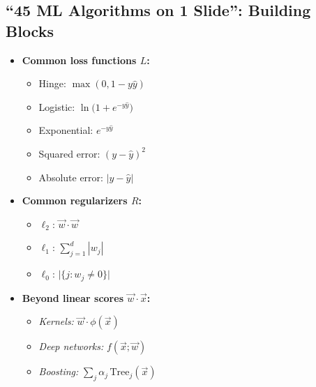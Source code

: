 \subsection{``45 ML Algorithms on 1 Slide'': Building Blocks}
\begin{itemize}
    \item \textbf{Common loss functions $L$:}
    \begin{itemize}
        \item Hinge: $\max(0,1-y\hat{y})$
        \item Logistic: $\ln\!\big(1+e^{-y\hat{y}}\big)$
        \item Exponential: $e^{-y\hat{y}}$
        \item Squared error: $(y-\hat{y})^2$
        \item Absolute error: $\lvert y-\hat{y}\rvert$
    \end{itemize}
    \item \textbf{Common regularizers $R$:}
    \begin{itemize}
        \item $\ell_2$: $\vec{w}\!\cdot\!\vec{w}$
        \item $\ell_1$: $\sum_{j=1}^d |w_j|$
        \item $\ell_0$: $\big|\{j: w_j\neq 0\}\big|$
    \end{itemize}
    \item \textbf{Beyond linear scores $\vec{w}\!\cdot\!\vec{x}$:}
    \begin{itemize}
        \item \textit{Kernels:} $\vec{w}\!\cdot\!\phi(\vec{x})$
        \item \textit{Deep networks:} $f(\vec{x};\vec{w})$
        \item \textit{Boosting:} $\sum_j \alpha_j\,\mathrm{Tree}_j(\vec{x})$
    \end{itemize}
\end{itemize}
